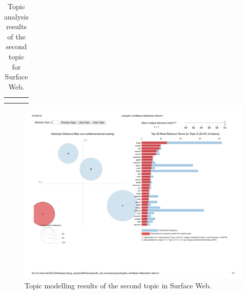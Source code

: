 \begin{table}[h!]
{\begin{tabular}{@{}lll@{}}
 &  &  \\
\rowcolor[HTML]{EFEFEF} 
 &  & \\ \bottomrule
\end{tabular}
}
\caption{Topic analysis results of the second topic for Surface Web.}
\label{tab:topicmodelling_2}
\end{table}


\begin{figure}[h!]
\begin{center}
\includegraphics[scale=0.4]{./img/codingALL_topic2.pdf}
\end{center}
\caption{Topic modelling results of the second topic in Surface Web.}
\label{fig:topicmodelling_2}
\end{figure}





